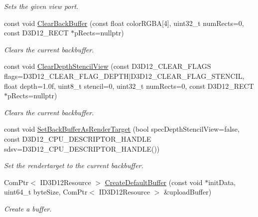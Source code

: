 \begin{DoxyCompactItemize}
\begin{DoxyCompactList}\small\item\em Sets the given view port. \end{DoxyCompactList}\item 
const void \hyperlink{class_ensum_1_1_graphics_1_1_direct3_d12_af49d60fc2f5d8febbab527fb98d238e0}{Clear\+Back\+Buffer} (const float color\+R\+G\+BA\mbox{[}4\mbox{]}, uint32\+\_\+t num\+Rects=0, const D3\+D12\+\_\+\+R\+E\+CT $\ast$p\+Rects=nullptr)
\begin{DoxyCompactList}\small\item\em Clears the current backbuffer. \end{DoxyCompactList}\item 
const void \hyperlink{class_ensum_1_1_graphics_1_1_direct3_d12_aad4daa8244f4db18cec290d009988df8}{Clear\+Depth\+Stencil\+View} (const D3\+D12\+\_\+\+C\+L\+E\+A\+R\+\_\+\+F\+L\+A\+GS flags=D3\+D12\+\_\+\+C\+L\+E\+A\+R\+\_\+\+F\+L\+A\+G\+\_\+\+D\+E\+P\+TH$\vert$D3\+D12\+\_\+\+C\+L\+E\+A\+R\+\_\+\+F\+L\+A\+G\+\_\+\+S\+T\+E\+N\+C\+IL, float depth=1.\+0f, uint8\+\_\+t stencil=0, uint32\+\_\+t num\+Rects=0, const D3\+D12\+\_\+\+R\+E\+C\+T $\ast$p\+Rects=nullptr)
\begin{DoxyCompactList}\small\item\em Clears the current backbuffer. \end{DoxyCompactList}\item 
const void \hyperlink{class_ensum_1_1_graphics_1_1_direct3_d12_ab7487166c3eda609467275b33a32e4b0}{Set\+Back\+Buffer\+As\+Render\+Target} (bool spec\+Depth\+Stencil\+View=false, const D3\+D12\+\_\+\+C\+P\+U\+\_\+\+D\+E\+S\+C\+R\+I\+P\+T\+O\+R\+\_\+\+H\+A\+N\+D\+LE sdsv=D3\+D12\+\_\+\+C\+P\+U\+\_\+\+D\+E\+S\+C\+R\+I\+P\+T\+O\+R\+\_\+\+H\+A\+N\+D\+LE())
\begin{DoxyCompactList}\small\item\em Set the rendertarget to the current backbuffer. \end{DoxyCompactList}\item 
Com\+Ptr$<$ I\+D3\+D12\+Resource $>$ \hyperlink{class_ensum_1_1_graphics_1_1_direct3_d12_ad0bea02aef7160843feb2e88c1d977ad}{Create\+Default\+Buffer} (const void $\ast$init\+Data, uint64\+\_\+t byte\+Size, Com\+Ptr$<$ I\+D3\+D12\+Resource $>$ \&upload\+Buffer)
\begin{DoxyCompactList}\small\item\em Create a buffer. \end{DoxyCompactList}\end{DoxyCompactItemize}
